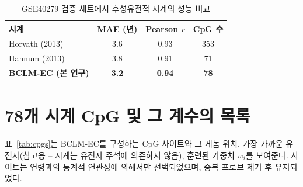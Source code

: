 \documentclass[12pt,a4paper]{article}
\begin{document}
	\begin{table}[H]
		\centering
		\caption{GSE40279 검증 세트에서 후성유전적 시계의 성능 비교}
		\label{tab:clock-comparison}
		\begin{tabular}{lccc}
			\toprule
			\textbf{시계} & \textbf{MAE (년)} & \textbf{Pearson \(r\)} & \textbf{CpG 수} \\
			\midrule
			Horvath (2013) & 3.6 & 0.93 & 353 \\
			Hannum (2013)\footnotemark & 3.8 & 0.91 & 71 \\
			\textbf{BCLM-EC (본 연구)} & \textbf{3.2} & \textbf{0.94} & \textbf{78} \\
			\bottomrule
		\end{tabular}
	\end{table}
	
	\section{78개 시계 CpG 및 그 계수의 목록}
	\label{sec:cpgs}
	표~\ref{tab:cpgs}는 BCLM-EC를 구성하는 CpG 사이트와 그 게놈 위치, 가장 가까운 유전자(참고용 – 시계는 유전자 주석에 의존하지 않음), 훈련된 가중치 \(w_i\)를 보여준다. 사이트는 연령과의 통계적 연관성에 의해서만 선택되었으며, 중복 프로브 제거 후 유지되었다.
	
\end{document}
